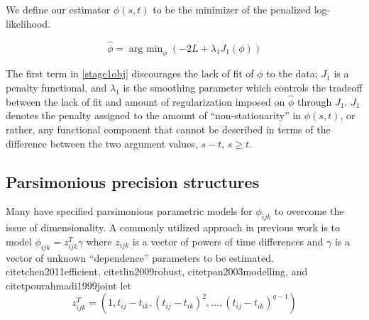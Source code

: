 \documentclass[12pt]{article}
\theoremstyle{definition}
\begin{document}
 We define our estimator $\hat{\phi}\left(s,t\right)$ to be the minimizer of the penalized log-likelihood. %


\begin{equation} 
\hat{\phi} = \mathop{\mbox{arg min}}_{\phi} \left( -2 L + \lambda_1 J_1\left(\phi\right) \right) \label{stage1obj}
\end{equation}
\noindent


The first term in \eqref{stage1obj} discourages the lack of fit of $\phi$ to the data; $J_1$ is a penalty functional, and $\lambda_1$ is the smoothing parameter which controls the tradeoff between the lack of fit and amount of regularization imposed on $\hat{\phi}$ through $J_1$.  $J_1$ denotes the penalty assigned to the amount of ``non-stationarity'' in $\phi\left(s,t\right)$, or rather, any functional component that cannot be described in terms of the difference between the two argument values, $s-t$, $s \ge t$. %

\subsection{Parsimonious  precision  structures}

Many have specified parsimonious parametric models for $\phi_{ijk}$ to overcome the issue of dimensionality. A commonly utilized approach in previous work is to model $\phi_{ijk} = z_{ijk}^T \gamma$ where $z_{ijk}$ is a vector of powers of time differences and $\gamma$ is a vector of unknown ``dependence'' parameters to be estimated. citet{chen2011efficient}, citet{lin2009robust}, citet{pan2003modelling},  and citet{pourahmadi1999joint} let 
\begin{equation}
z_{ijk}^T = \left(1, t_{ij} - t_{ik},\left( t_{ij} - t_{ik} \right)^2, \dots, \left(t_{ij} - t_{ik}\right)^{q-1} \right) \label{covmodel}
\end{equation}
\end{document}
